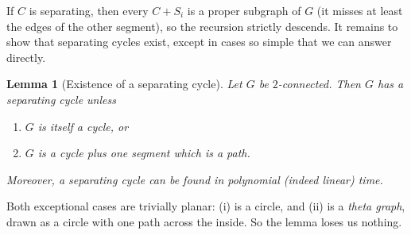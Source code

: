 \documentclass[11pt,a4paper]{article}
\theoremstyle{plain}
\newtheorem{lemma}[theorem]{Lemma}
\theoremstyle{definition}
\theoremstyle{remark}
\begin{document}
If $C$ is separating, then every $C + S_i$ is a proper subgraph of $G$ (it
misses at least the edges of the other segment), so the recursion strictly
descends. It remains to show that separating cycles exist, except in cases so
simple that we can answer directly.

\begin{lemma}[Existence of a separating cycle]\label{lem:sepcycle}
Let $G$ be $2$-connected. Then $G$ has a separating cycle unless
\begin{enumerate}[label=(\roman*),nosep]
  \item $G$ is itself a cycle, or
  \item $G$ is a cycle plus one segment which is a path.
\end{enumerate}
Moreover, a separating cycle can be found in polynomial (indeed linear) time.
\end{lemma}

Both exceptional cases are trivially planar: (i) is a circle, and (ii) is a
\emph{theta graph}, drawn as a circle with one path across the inside. So the
lemma loses us nothing.
\end{document}
